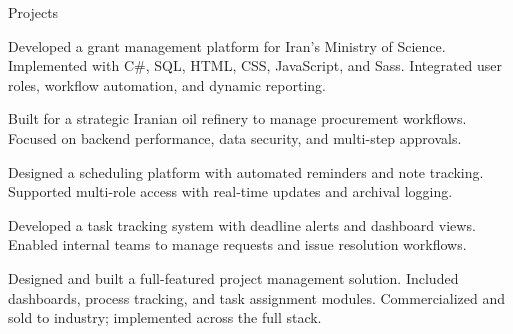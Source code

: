 \begin{rubric}{Projects}

  Developed a grant management platform for Iran’s Ministry of Science.
  Implemented with C\#, SQL, HTML, CSS, JavaScript, and Sass.
  Integrated user roles, workflow automation, and dynamic reporting.

  Built for a strategic Iranian oil refinery to manage procurement workflows.
  Focused on backend performance, data security, and multi-step approvals.

  Designed a scheduling platform with automated reminders and note tracking.
  Supported multi-role access with real-time updates and archival logging.

  Developed a task tracking system with deadline alerts and dashboard views.
  Enabled internal teams to manage requests and issue resolution workflows.

  Designed and built a full-featured project management solution.
  Included dashboards, process tracking, and task assignment modules.
  Commercialized and sold to industry; implemented across the full stack.

\end{rubric}